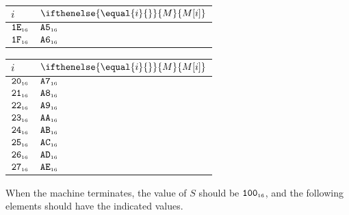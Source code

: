 \documentclass[a4paper,12pt]{article}
\makeatletter
\newcommand{\num}[1]{\texttt{#1}}
\newcommand{\hex}[1]{\num{#1}_{\textup{\tiny 16}}}
\newcommand{\MEM}[1]{\ifthenelse{\equal{#1}{}}{M}{M[#1]}}
\newcommand{\SP}{S}
\newenvironment{memtable}{%
  \begin{trivlist}
    \item
    }{%
    \end{trivlist}}
\newenvironment{memcolumn}{%
  \begin{tabular}{@{}ll@{}}
    $i$ & $\MEM{i}$ \\
    \hline}
    {%
  \end{tabular}}
\newcommand{\memspace}{\qquad}
\makeatother
\begin{document}
\begin{memtable}
\begin{memcolumn}
    $\hex{1E}$ & $\hex{A5}$ \\
    $\hex{1F}$ & $\hex{A6}$ \\
  \end{memcolumn}
  \memspace
  \begin{memcolumn}
    $\hex{20}$ & $\hex{A7}$ \\
    $\hex{21}$ & $\hex{A8}$ \\
    $\hex{22}$ & $\hex{A9}$ \\
    $\hex{23}$ & $\hex{AA}$ \\
    $\hex{24}$ & $\hex{AB}$ \\
    $\hex{25}$ & $\hex{AC}$ \\
    $\hex{26}$ & $\hex{AD}$ \\
    $\hex{27}$ & $\hex{AE}$ \\
  \end{memcolumn}
\end{memtable}
When the machine terminates, the value of $\SP$ should be $\hex{100}$, and the following elements should have the indicated values.
\end{document}

